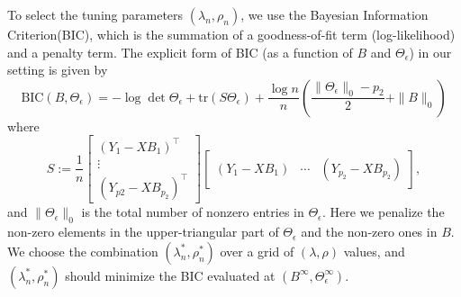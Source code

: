 To select the tuning parameters $(\lambda_n,\rho_n)$, we use the Bayesian Information Criterion(BIC), which is the summation of a goodness-of-fit term (log-likelihood) and a penalty term. The explicit form of BIC (as a function of $B$ and $\Theta_\epsilon$) in our setting is 
given by 
\begin{equation*}
\text{BIC}(B,\Theta_\epsilon) = -\log\det\Theta_\epsilon + \text{tr}(S\Theta_\epsilon) + \frac{\log n}{n} (\frac{\|\Theta_\epsilon\|_0-p_2}{2} + \|B\|_0)
\end{equation*}
where 
\begin{equation*}
S :=  \frac{1}{n}\begin{bmatrix}
(Y_1-XB_1)^\top \\  \vdots \\ (Y_{p2}-XB_{p_2})^\top  
\end{bmatrix} \begin{bmatrix}
(Y_1-XB_1) & \cdots & (Y_{p_2}-XB_{p_2})
\end{bmatrix},
\end{equation*}
and $\|\Theta_\epsilon\|_0$ is the total number of nonzero entries in $\Theta_\epsilon$. Here we penalize the non-zero elements in the upper-triangular part of $\Theta_\epsilon$ and the non-zero ones in 
$B$. We choose the combination $(\lambda_n^*,\rho_n^*)$ over a grid of $(\lambda,\rho)$ values, and $(\lambda_n^*,\rho_n^*)$ should minimize the BIC evaluated at $(B^{\infty},\Theta_\epsilon^{\infty})$.  \\
